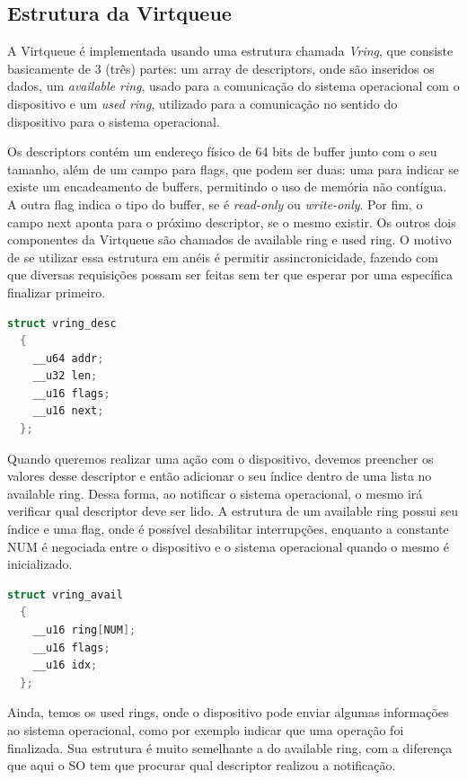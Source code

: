 \subsection{Estrutura da Virtqueue}

A Virtqueue é implementada usando uma estrutura chamada \emph{Vring}, que consiste basicamente de 3 (três) partes: um array de descriptors, onde são inseridos os dados,
um \emph{available ring}, usado para a comunicação do sistema operacional com o dispositivo e um \emph{used ring}, utilizado para a comunicação no sentido do dispositivo para o sistema operacional.

Os descriptors contém um endereço físico de 64 bits de buffer junto com o seu tamanho, além de um campo para flags, que podem ser duas: uma para indicar se existe um encadeamento de buffers, permitindo o uso de memória não contígua. 
A outra flag indica o tipo do buffer, se é \emph{read-only} ou \emph{write-only}. Por fim, o campo next aponta para o próximo descriptor, se o mesmo existir. Os outros dois componentes da Virtqueue são chamados de available ring e used ring. O motivo de se utilizar essa estrutura em anéis é permitir assincronicidade, fazendo com que diversas requisições possam ser feitas sem ter que esperar por uma específica finalizar primeiro.

\begin{lstlisting}[language=C]
  struct vring_desc
  {
    __u64 addr;
    __u32 len;
    __u16 flags;
    __u16 next;
  };
\end{lstlisting}


Quando queremos realizar uma ação com o dispositivo, devemos preencher os valores desse descriptor e então adicionar o seu índice dentro de uma lista no available ring.
Dessa forma, ao notificar o sistema operacional, o mesmo irá verificar qual descriptor deve ser lido. A estrutura de um available ring possui seu índice e uma flag, onde é possível desabilitar interrupções, enquanto a constante NUM é negociada entre o dispositivo e o sistema operacional quando o mesmo é inicializado.

\begin{lstlisting}[language=C]
  struct vring_avail
  {
    __u16 ring[NUM];
    __u16 flags;
    __u16 idx;
  };
\end{lstlisting}

Ainda, temos os used rings, onde o dispositivo pode enviar algumas informações ao sistema operacional, como por exemplo indicar que uma operação foi finalizada.
Sua estrutura é muito semelhante a do available ring, com a diferença que aqui o SO tem que procurar qual descriptor realizou a notificação.

